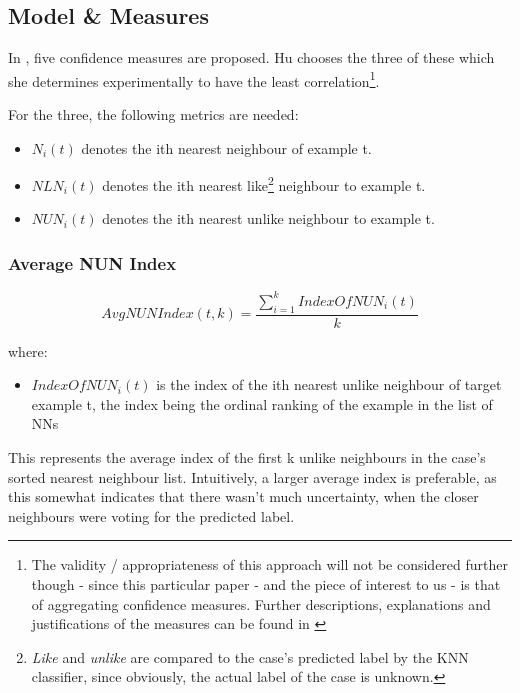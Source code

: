\documentclass[a4paper,11pt]{report}
\begin{document}
\subsection{Model \& Measures}

In \citet{Delany2005}, five confidence measures are proposed. Hu chooses the three of these which she determines experimentally to have the least correlation\footnote{The validity / appropriateness of this approach will not be considered further though - since this particular paper - and the piece of interest to us - is that of aggregating confidence measures. Further descriptions, explanations and justifications of the measures can be found in \citet{Delany2005}}.

For the three, the following metrics are needed:
\begin{itemize} 
	\item $N_{i}(t)$ denotes the ith nearest neighbour of example t.
	\item $NLN_{i}(t)$ denotes the ith nearest like\footnote{\emph{Like} and \emph{unlike} are compared to the case's predicted label by the KNN classifier, since obviously, the actual label of the case is unknown.} neighbour to example t.
	\item $NUN_{i}(t)$ denotes the ith nearest unlike neighbour to example t.
\end{itemize}

\subsubsection{Average NUN Index}

\[
AvgNUNIndex(t,k)=\frac{\sum_{i=1}^{k}IndexOfNUN_{i}(t)}{k}
\]

where:
\begin{itemize}
	\item $IndexOfNUN_{i}(t)$ is the index of the ith nearest unlike neighbour of target example t, the index being the ordinal ranking of the example in the list of NNs
\end{itemize}

This represents the average index of the first k unlike neighbours in the case's sorted nearest neighbour list. Intuitively, a larger average index is preferable, as this somewhat indicates that there wasn't much uncertainty, when the closer neighbours were voting for the predicted label.
\vspace{10pt}
\end{document}
